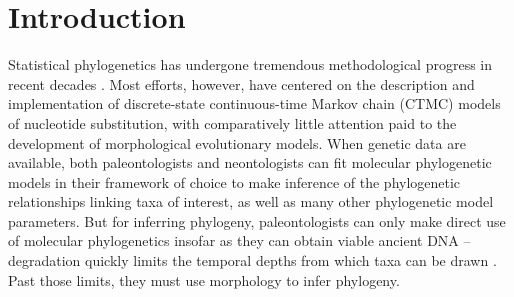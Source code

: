 \documentclass[10pt, twocolumn, twoside]{article}
\begin{document}


\section{Introduction}

Statistical phylogenetics has undergone tremendous methodological progress in recent decades \citep{hollandRiseStatisticalPhylogenetics2013}. Most efforts, however, have centered on the description and implementation of discrete-state continuous-time Markov chain (CTMC) models of nucleotide substitution, with comparatively little attention paid to the development of morphological evolutionary models. When genetic data are available, both paleontologists and neontologists can fit molecular phylogenetic models in their framework of choice to make inference of the phylogenetic relationships linking taxa of interest, as well as many other phylogenetic model parameters. But for inferring phylogeny, paleontologists can only make direct use of molecular phylogenetics insofar as they can obtain viable ancient DNA – degradation quickly limits the temporal depths from which taxa can be drawn \citep{collinsSurvivalOrganicMatter2002, allentoftHalflifeDNABone2012, pickrellNewHistoryGeography2014}. Past those limits, they must use morphology to infer phylogeny.
\end{document}
